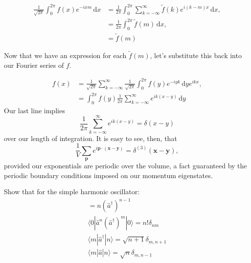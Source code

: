 \documentclass[../qft-for-the-gifted-amateur.tex]{subfiles}
\begin{document}
\begin{questions}
\begin{solution}
	\begin{align*}
		\frac{1}{\sqrt{2\pi}}\int_{0}^{2\pi}f(x)e^{- ixm}\,\mathrm{d}x &= \frac{1}{2\pi}\int_{0}^{2\pi}\sum_{k=-\infty}^{\infty}\tilde{f}(k)e^{i(k - m)x}\,\mathrm{d}x, \\
		&= \frac{1}{2\pi}\int_{0}^{2\pi}\tilde{f}(m)\,\mathrm{d}x, \\
		&= \tilde{f}(m)
	\end{align*}

	Now that we have an expression for each $\tilde{f}(m)$, let's
	substitute this back into our Fourier series of $f$.

	\begin{align*}
	f(x) &= \frac{1}{\sqrt{2\pi}}\sum_{k=-\infty}^{\infty}\frac{1}{\sqrt{2\pi}}\int_{0}^{2\pi}f(y)e^{-iyk}\,\mathrm{d}ye^{ikx}, \\
	     &= \int_{0}^{2\pi}f(y)\frac{1}{2\pi}\sum_{k = - \infty}^{\infty}e^{ik(x - y)}\,\mathrm{d}y
	\end{align*}
	Our last line implies
	\[
		\frac{1}{2\pi}\sum_{k=-\infty}^{\infty}e^{ik(x - y)} = \delta(x - y)
	\]
	over our length of integration. It is easy to see, then, that
	\[
	\frac{1}{V}\sum_{\mathbf{p}}e^{i\mathbf{p} \cdot (\mathbf{x} - \mathbf{y})} = \delta^{(3)}(\mathbf{x} - \mathbf{y}),
	\]
	provided our exponentials are periodic over the volume, a fact
	guaranteed by the periodic boundary conditions imposed on our momentum
	eigenstates.
\end{solution}

	\question Show that for the simple harmonic oscillator:
	\begin{gather*}
	[\hat{a},({\hat{a}}^{\dagger})^{n}] = n({\hat{a}}^{\dagger})^{n - 1} \\
	\langle 0|{\hat{a}}^{n}({\hat{a}}^{\dagger})^{m}|0\rangle = n!\delta_{nm} \\
	\langle m|{\hat{a}}^{\dagger}|n\rangle = \sqrt{n + 1}\delta_{m,n + 1} \\
	\langle m|\hat{a}|n\rangle = \sqrt{n}\delta_{m,n - 1}
	\end{gather*}


\end{questions}
\end{document}
